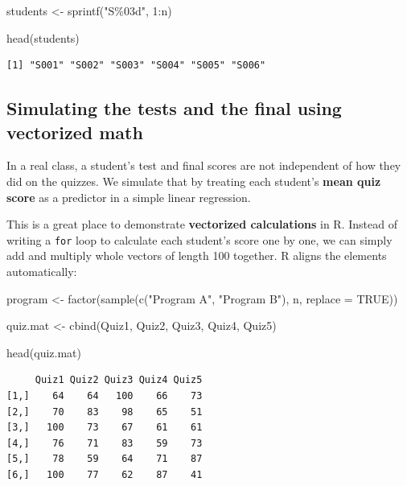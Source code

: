 \documentclass[
  letterpaper,
  DIV=11,
  numbers=noendperiod]{scrreprt}
\newenvironment{Shaded}{\begin{snugshade}}{\end{snugshade}}
\newcommand{\AttributeTok}[1]{\textcolor[rgb]{0.40,0.45,0.13}{#1}}
\newcommand{\ConstantTok}[1]{\textcolor[rgb]{0.56,0.35,0.01}{#1}}
\newcommand{\DecValTok}[1]{\textcolor[rgb]{0.68,0.00,0.00}{#1}}
\newcommand{\FunctionTok}[1]{\textcolor[rgb]{0.28,0.35,0.67}{#1}}
\newcommand{\NormalTok}[1]{\textcolor[rgb]{0.00,0.23,0.31}{#1}}
\newcommand{\OtherTok}[1]{\textcolor[rgb]{0.00,0.23,0.31}{#1}}
\newcommand{\SpecialCharTok}[1]{\textcolor[rgb]{0.37,0.37,0.37}{#1}}
\newcommand{\StringTok}[1]{\textcolor[rgb]{0.13,0.47,0.30}{#1}}
\begin{document}
\begin{Shaded}
\begin{Highlighting}[]
\NormalTok{students }\OtherTok{\textless{}{-}} \FunctionTok{sprintf}\NormalTok{(}\StringTok{"S\%03d"}\NormalTok{, }\DecValTok{1}\SpecialCharTok{:}\NormalTok{n)}

\FunctionTok{head}\NormalTok{(students)}
\end{Highlighting}
\end{Shaded}

\begin{verbatim}
[1] "S001" "S002" "S003" "S004" "S005" "S006"
\end{verbatim}

\subsection{Simulating the tests and the final using vectorized
math}\label{simulating-the-tests-and-the-final-using-vectorized-math}

In a real class, a student's test and final scores are not independent
of how they did on the quizzes. We simulate that by treating each
student's \textbf{mean quiz score} as a predictor in a simple linear
regression.

This is a great place to demonstrate \textbf{vectorized calculations} in
R. Instead of writing a \texttt{for} loop to calculate each student's
score one by one, we can simply add and multiply whole vectors of length
100 together. R aligns the elements automatically:

\begin{Shaded}
\begin{Highlighting}[]
\NormalTok{program }\OtherTok{\textless{}{-}} \FunctionTok{factor}\NormalTok{(}\FunctionTok{sample}\NormalTok{(}\FunctionTok{c}\NormalTok{(}\StringTok{"Program A"}\NormalTok{, }\StringTok{"Program B"}\NormalTok{), n, }\AttributeTok{replace =} \ConstantTok{TRUE}\NormalTok{))}

\NormalTok{quiz.mat }\OtherTok{\textless{}{-}} \FunctionTok{cbind}\NormalTok{(Quiz1, Quiz2, Quiz3, Quiz4, Quiz5)}

\FunctionTok{head}\NormalTok{(quiz.mat)}
\end{Highlighting}
\end{Shaded}

\begin{verbatim}
     Quiz1 Quiz2 Quiz3 Quiz4 Quiz5
[1,]    64    64   100    66    73
[2,]    70    83    98    65    51
[3,]   100    73    67    61    61
[4,]    76    71    83    59    73
[5,]    78    59    64    71    87
[6,]   100    77    62    87    41
\end{verbatim}
\end{document}
